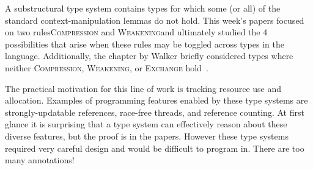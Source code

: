 \documentclass{article}
\begin{document}

A substructural type system contains types for which some (or all) of the standard context-manipulation lemmas do not hold.
This week's papers focused on two rules\textemdash \textsc{Compression} and \textsc{Weakening}\textemdash and ultimately studied the 4 possibilities that arise when these rules may be toggled across types in the language.
Additionally, the chapter by Walker briefly considered types where neither \textsc{Compression}, \textsc{Weakening}, or \textsc{Exchange} hold~\cite{w-substructural}.

\qquad The practical motivation for this line of work is tracking resource use and allocation.
Examples of programming features enabled by these type systems are strongly-updatable references, race-free threads, and reference counting.
At first glance it is surprising that a type system can effectively reason about these diverse features, but the proof is in the papers.
However these type systems required very careful design and would be difficult to program in.
There are too many annotations!
\end{document}
